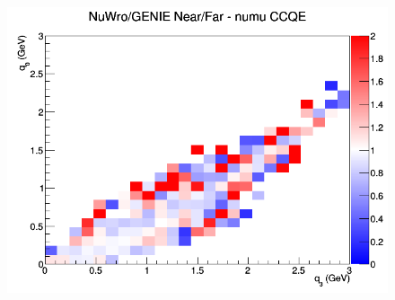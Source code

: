 \begin{figure}[h]
\endminipage
{}
\includegraphics[width=\linewidth]{eff_q0_q3/GAr/ratios/CCQE_NuWro_GENIE_numu_NF_q3_q0.png}
\endminipage
\newline
\end{figure}
\clearpage
